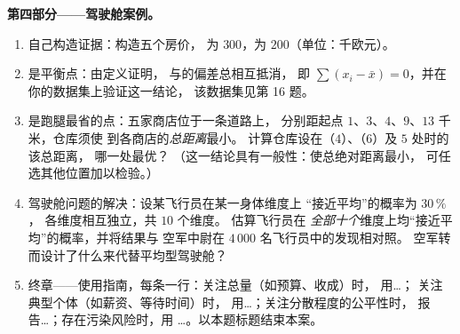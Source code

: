 \begin{problem}
\medskip
\noindent\textbf{第四部分——驾驶舱案例。}
\begin{enumerate}[resume]
  \item 自己构造证据：构造五个房价，
        为 $300$，为 $200$（单位：千欧元）。
  \item {}是平衡点：由定义证明，
        与的偏差总相互抵消，
        即 $\sum (x_i - \bar x) = 0$，并在你的数据集上验证这一结论，
        该数据集见第 16 题。
  \item {}是跑腿最省的点：五家商店位于一条道路上，
        分别距起点 $1$、$3$、$4$、$9$、$13$ 千米，仓库须使
        到各商店的\emph{总距离}最小。
        计算仓库设在（$4$）、（$6$）及 $5$ 处时的该总距离，
        哪一处最优？
        （这一结论具有一般性：使总绝对距离最小，
        可任选其他位置加以检验。）
  \item 驾驶舱问题的解决：设某飞行员在某一身体维度上
        “接近平均”的概率为 $30\,\%$，
        各维度相互独立，共 $10$ 个维度。
        估算飞行员在
        \emph{全部十个}维度上均“接近平均”的概率，并将结果与
        空军中尉在 $4\,000$ 名飞行员中的发现相对照。
        空军转而设计了什么来代替平均型驾驶舱？
  \item 终章——使用指南，每条一行：关注总量（如预算、收成）时，
        用\dots；
        关注典型个体（如薪资、等待时间）时，
        用\dots；关注分散程度的公平性时，
        报告\dots；存在污染风险时，用
        \dots。以本题标题结束本案。
\end{enumerate}
\end{problem}
